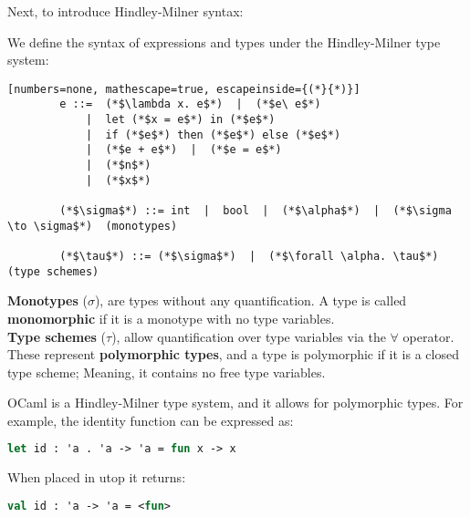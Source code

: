 \noindent
Next, to introduce Hindley-Milner syntax: 
\begin{Def}

    We define the syntax of expressions and types under the Hindley-Milner type system:
    
    \begin{lstlisting}[numbers=none, mathescape=true, escapeinside={(*}{*)}]
        e ::=  (*$\lambda x. e$*)  |  (*$e\ e$*) 
            |  let (*$x = e$*) in (*$e$*) 
            |  if (*$e$*) then (*$e$*) else (*$e$*) 
            |  (*$e + e$*)  |  (*$e = e$*) 
            |  (*$n$*) 
            |  (*$x$*)

        (*$\sigma$*) ::= int  |  bool  |  (*$\alpha$*)  |  (*$\sigma \to \sigma$*)  (monotypes)
        
        (*$\tau$*) ::= (*$\sigma$*)  |  (*$\forall \alpha. \tau$*)                    (type schemes)
    \end{lstlisting}
    
    \noindent
    \textbf{Monotypes} ($\sigma$), are types without any quantification. A type is called \textbf{monomorphic} if it is a monotype
    with no type variables.\\
    
    \noindent
    \textbf{Type schemes} ($\tau$), allow quantification over type variables via the $\forall$ operator. These represent \textbf{polymorphic types}, and a type is polymorphic if it is a closed type scheme; Meaning,
    it contains no free type variables.
    
    \end{Def}

\begin{Example}

    OCaml is a Hindley-Milner type system, and it allows for polymorphic types. For example, the identity function can be expressed as:
    \begin{lstlisting}[language=OCaml, numbers=none]
        let id : 'a . 'a -> 'a = fun x -> x
    \end{lstlisting}
    
    \noindent
    When placed in utop it returns:
    \begin{lstlisting}[language=OCaml, numbers=none]
        val id : 'a -> 'a = <fun>
    \end{lstlisting}
\end{Example}
    
